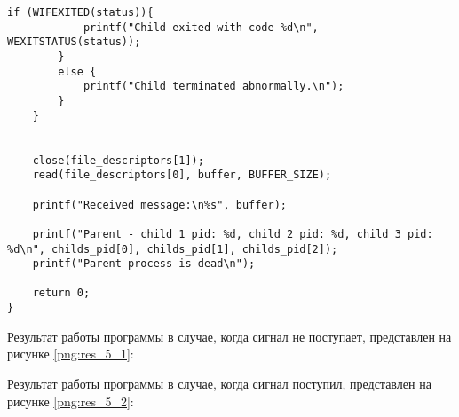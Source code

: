 \begin{lstlisting}[label = exec, caption=Использование сигнала.]
		if (WIFEXITED(status)){
			printf("Child exited with code %d\n", WEXITSTATUS(status));
		}
		else {
			printf("Child terminated abnormally.\n");
		}
	}
	
	
	close(file_descriptors[1]);
	read(file_descriptors[0], buffer, BUFFER_SIZE);
	
	printf("Received message:\n%s", buffer);
	
	printf("Parent - child_1_pid: %d, child_2_pid: %d, child_3_pid: %d\n", childs_pid[0], childs_pid[1], childs_pid[2]);
	printf("Parent process is dead\n");
	
	return 0;
}

\end{lstlisting}


Результат работы программы в случае, когда сигнал не поступает, представлен на рисунке \ref{png:res_5_1}:

\begin{figure}[H]
\end{figure}

Результат работы программы в случае, когда сигнал поступил, представлен на рисунке \ref{png:res_5_2}:

\begin{figure}[H]
\end{figure}
